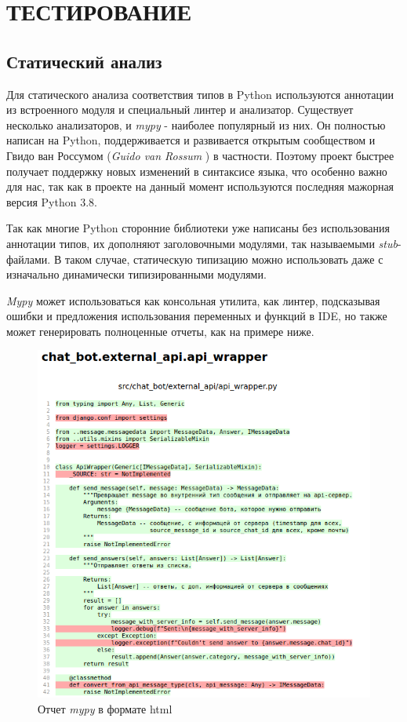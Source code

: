 \section{ТЕСТИРОВАНИЕ}
    \subsection{Статический анализ}
    Для статического анализа соответствия типов в Python используются аннотации 
    из встроенного модуля  и специальный линтер и анализатор.
    Существует несколько анализаторов,
    и \textit{mypy} \cite{docs.mypy} - наиболее популярный из них.
    Он полностью написан на Python, поддерживается и развивается открытым
    сообществом 
    и Гвидо ван Россумом (\textit{Guido van Rossum} \cite{guido.van.rossum})
    в частности. Поэтому проект быстрее получает поддержку новых изменений в
    синтаксисе языка, что особенно важно для нас, так как в проекте на данный
    момент используются последняя мажорная версия Python 3.8.

    Так как многие Python сторонние библиотеки уже написаны без использования
    аннотации типов, их дополняют заголовочными модулями,
    так называемыми \textit{stub}-файлами. В таком случае, статическую типизацию
    можно использовать даже с изначально динамически типизированными модулями.
    
    \textit{Mypy} может использоваться как консольная утилита,
    как линтер, подсказывая ошибки и предложения использования переменных и 
    функций в IDE, 
    но также может генерировать полноценные отчеты, как на примере ниже.
    \begin{figure}[H]
        \centering
        \includegraphics[width=\linewidth]{static/mypy-report.png}
        \caption{Отчет \textit{mypy} в формате html}
        \label{fig:mypy-report}
    \end{figure}
    
